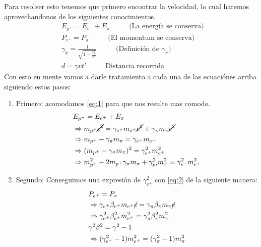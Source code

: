 \documentclass[12pt]{exam}
\begin{document}
\begin{enumerate}
    Para resolver esto tenemos que primero encontrar la velocidad, lo cual haremos aprovechandonos de los siguientes conocimientos.
    \begin{align}
      &E_{p^+} = E_{e^+} + E_{\pi} \hspace{1cm}\text{ (La energía se conserva) }\label{eq:1}\\
      &P_{e^+} = P_{\pi} \hspace{1cm}\text{ (El momentum se conserva) }\label{eq:2}\\
      &\gamma_\pi = \frac{1}{\sqrt{1-\frac{v_\pi^2}{c^2}}}\hspace{1cm} \text{ (Definición de $\gamma_\pi$) } \label{eq:3}\\
      & d = \gamma v t' \hspace{1cm} \text{ Distancia recorrida } \label{eq:4}
    \end{align}
    Con esto en mente vamos a darle tratamiento a cada una de las ecuaciónes arriba siguiendo estos pasos:
    \begin{enumerate}
      \item Primero: acomodamos \ref{eq:1} para que nos resulte mas comodo.
        \begin{align*}
          &E_{p^+} = E_{e^+} + E_{\pi}\\
          &\Rightarrow m_{p^+}\cancel{c^2} = \gamma_{e^+}m_{e^+}\cancel{c^2} + \gamma_{\pi}m_{\pi}\cancel{c^2}\\
          &\Rightarrow m_{p^+} - \gamma_{\pi}m_{\pi} = \gamma_{e^+}m_{e^+}\\
          &\Rightarrow (m_{p^+} - \gamma_{\pi}m_{\pi})^2 = \gamma_{e^+}^2m_{e^+}^2\\
          &\Rightarrow m_{p^+}^2 - 2m_{p^+}\gamma_{\pi}m_{\pi} + \gamma_{pi}^2m_{\pi}^2 = \gamma_{e^+}^2m_{e^+}^2
        \end{align*}
      \item Segundo: Conseguimos una expresión de $\gamma_{e^{+}}^2$ con \ref{eq:2} de la siguiente manera:
        \begin{align*}
          &P_{e^+} = P_{\pi}\\
          &\Rightarrow\gamma_{e^+}\beta_{e^+}m_{e^+}\cancel{c} = \gamma_{\pi}\beta_{\pi}m_{\pi}\cancel{c}\\
          &\Rightarrow\gamma_{e^+}^2\beta_{e^+}^2m_{e^+}^2 = \gamma_{\pi}^2\beta_{\pi}^2m_{\pi}^2\\
          &\gamma^2\beta^2 = \gamma^2 - 1\\
          &\Rightarrow (\gamma_{e^+}^2-1)m_{e^+}^2 = (\gamma_{\pi}^2 - 1)m_{\pi}^2\\

\end{align*}
\end{enumerate}
\end{enumerate}
\end{document}
